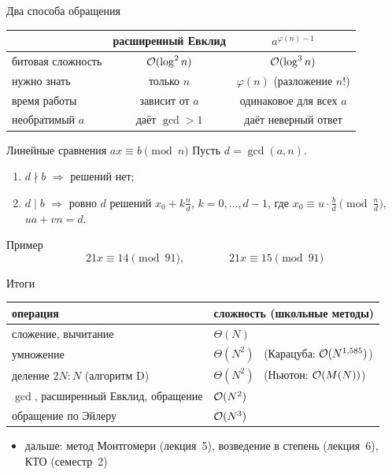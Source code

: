 \documentclass{ca-slides}
\begin{document}
\begin{canvasframe}{Два способа обращения}
  \begin{tabular}{l|c|c}
    & расширенный Евклид & $a^{\varphi(n) - 1}$ \\ \hline
    битовая сложность & $\mathcal{O}(\log^2 n)$ & $\mathcal{O}(\log^3 n)$ \\
    нужно знать & только $n$ & $\varphi(n)$ (разложение $n$!) \\
    время работы & зависит от $a$ & одинаковое для всех $a$ \\
    необратимый $a$ & даёт $\gcd > 1$ & даёт неверный ответ
  \end{tabular}
  \penspace[0.2\textheight]
\end{canvasframe}

\begin{theoremframe}{Линейные сравнения $ax \equiv b \pmod n$}
  Пусть $d = \gcd(a, n)$.
  \begin{enumerate}
    \item $d \nmid b$ $\Rightarrow$ решений нет;
    \item $d \mid b$ $\Rightarrow$ ровно $d$ решений $x_0 + k\frac nd$, $k = 0, \dots, d - 1$, где
      $x_0 \equiv u \cdot \frac bd \pmod{\frac nd}$, \ $ua + vn = d$.
  \end{enumerate}
\end{theoremframe}

\begin{canvasframe}{Пример}
  \[21x \equiv 14 \pmod{91}, \qquad\qquad 21x \equiv 15 \pmod{91}\]
  \penspace[0.4\textheight]
\end{canvasframe}

\begin{canvasframe}{Итоги}
  \small
  \begin{tabular}{l|l}
    операция & сложность (школьные методы) \\ \hline
    сложение, вычитание & $\Theta(N)$ \\
    умножение & $\Theta(N^2)$ \ (Карацуба: $\mathcal{O}(N^{1{,}585})$) \\
    деление $2N : N$ (алгоритм D) & $\Theta(N^2)$ \ (Ньютон: $\mathcal{O}(M(N))$) \\
    $\gcd$, расширенный Евклид, обращение & $\mathcal{O}(N^2)$ \\
    обращение по Эйлеру & $\mathcal{O}(N^3)$
  \end{tabular}
  \medskip
  \begin{itemize}
    \item дальше: метод Монтгомери (лекция~5), возведение в степень (лекция~6), КТО (семестр~2)
  \end{itemize}
\end{canvasframe}
\end{document}

